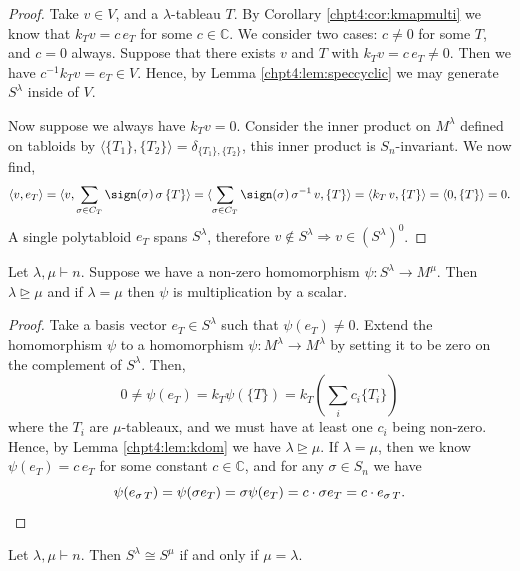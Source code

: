 \documentclass[11pt]{report}
\begin{document}
\begin{proof}
	Take $v \in V$, and a $\lambda$-tableau $T$. By Corollary \ref{chpt4:cor:kmapmulti} we know that $k_{T} v = c \, e_{T}$ for some $c\in \mathbb{C}$. We consider two cases:  $c\neq 0$ for some $T$, and $c=0$ always. Suppose that there exists $v$ and $T$ with $ k_{T} v = c \, e_{T} \neq 0$. Then we have $ c^{-1} k_{T} v = e_{T} \in V$. Hence, by Lemma \ref{chpt4:lem:speccyclic} we may generate $S^{\lambda}$ inside of $V$.
	
	Now suppose we always have $k_{T} v = 0$. Consider the inner product on $M^{\lambda}$ defined on tabloids by $\langle \{T_{1}\}, \{T_{2}\} \rangle = \delta_{\{T_{1}\},\{T_{2}\}}$, this inner product is $S_{n}$-invariant.
	We now find,
	\[\langle v, e_{T} \rangle = \langle v, \sum_{\sigma \in C_{T}} \sign(\sigma) \, \sigma \, \{T\} \rangle = \langle \sum_{\sigma \in C_{T}}\sign(\sigma)  \,\sigma^{-1} \,v, \{T\} \rangle  =\langle k_{T} \,v,  \{T\} \rangle = \langle 0 , \{T\} \rangle = 0 .\]
	A single polytabloid $e_{T}$ spans $S^{\lambda}$, therefore $v \notin S^{\lambda} \Rightarrow v \in (S^{\lambda})^{0}$.
\end{proof}






\begin{thm}
	\label{chpt4:thm:spechtmaps}
	Let $\lambda,\mu\vdash n$. Suppose we have a non-zero homomorphism $\psi:S^{\lambda} \to M^{\mu}$. Then $\lambda \trianglerighteq \mu$ and if $\lambda = \mu$ then $\psi$ is multiplication by a scalar.
\end{thm}
\begin{proof}
	Take a basis vector $e_{T} \in S^{\lambda}$ such that $\psi(e_{T}) \neq 0$. Extend the homomorphism $\psi$ to a homomorphism $\psi:M^{\lambda} \to M^{\lambda}$ by setting it to be zero on the complement of $S^{\lambda}$. Then,
	\[0 \neq \psi(e_{T}) = k_{T}\psi(\{T\}) = k_{T} \left( \sum_{i} c_{i} \{T_{i}\}\right)\]
	where the $T_{i}$ are $\mu$-tableaux, and we must have at least one $c_{i}$ being non-zero. Hence, by Lemma \ref{chpt4:lem:kdom} we have $\lambda \trianglerighteq \mu$.	If $\lambda = \mu$, then we know $\psi(e_{T}) = c \, e_{T}$ for some constant $c\in\mathbb{C}$, and for any $\sigma \in S_{n}$ we have
	\[\psi(e_{\sigma\,T}) = \psi( \sigma e_{T}) = \sigma \psi (e_{T}) = c\cdot \sigma e_{T} = c \cdot e_{\sigma \, T} \qedhere .\]
\end{proof}

\begin{corollary}
	\label{chpt4:cor:speciso}
	Let $\lambda,\mu \vdash n$. Then $S^{\lambda} \cong S^{\mu}$ if and only if $\mu = \lambda$.
\end{corollary}
\end{document}
